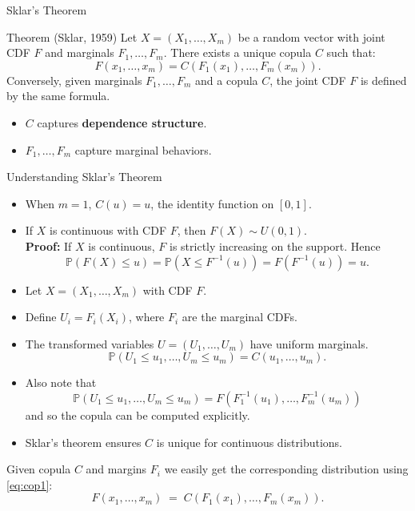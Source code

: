 \documentclass[11pt,handout,aspectratio=169]{beamer}
\begin{document}
\begin{frame}{Sklar's Theorem}
\begin{block}{Theorem (Sklar, 1959)}
Let $X = (X_1, \ldots, X_m)$ be a random vector with joint CDF $F$ and marginals $F_1, \ldots, F_m$. There exists a unique copula $C$ such that:
\[ F(x_1, \dots, x_m) = C(F_1(x_1), \dots, F_m(x_m)). \]
Conversely, given marginals $F_1, \ldots, F_m$ and a copula $C$, the joint CDF $F$ is defined by the same formula.
\end{block}
\begin{itemize}
    \item $C$ captures \textbf{dependence structure}.
    \item $F_1, \ldots, F_m$ capture marginal behaviors.
\end{itemize}
\end{frame}

\begin{frame}{Understanding Sklar's Theorem}
\begin{itemize}
    \item When $m = 1$, $C(u) = u$, the identity function on $[0, 1]$.\\[5mm]
    \item If $X$ is continuous with CDF $F$, then $F(X) \sim U(0, 1)$. \\[3mm]
    \textbf{Proof:} If $X$ is continuous, $F$ is strictly increasing on the support. Hence
    \[
    \mathbb{P}(F(X) \leq u) = \mathbb{P}(X \leq F^{-1}(u)) = F(F^{-1}(u)) = u.
    \]
\end{itemize}
\end{frame}

\begin{frame}{}
\begin{itemize}
    \item Let $X = (X_1, \ldots, X_m)$ with CDF $F$.
    \item Define $U_i = F_i(X_i)$, where $F_i$ are the marginal CDFs.
    \item The transformed variables $U = (U_1, \ldots, U_m)$ have uniform marginals.
    \[ \mathbb{P}(U_1 \leq u_1, \ldots, U_m \leq u_m) = C(u_1, \ldots, u_m). \]
    \item Also note that 
\begin{equation}\label{eq:cop1}
    \mathbb{P}(U_1 \leq u_1, \ldots, U_m \leq u_m) = F(F_1^{-1}(u_1),\ldots,F_m^{-1}(u_m))	
\end{equation}
    and so the copula can be computed explicitly.
    \item Sklar's theorem ensures $C$ is unique for continuous distributions.
\end{itemize}
\begin{alertblock}{}
	Given copula $C$ and margins $F_i$ we easily get the corresponding  distribution using \eqref{eq:cop1}:
	$$
	F(x_1,\ldots,x_m)\;=\;C(F_1(x_1),\ldots,F_m(x_m)).
	$$
\end{alertblock}
\end{frame}
\end{document}
